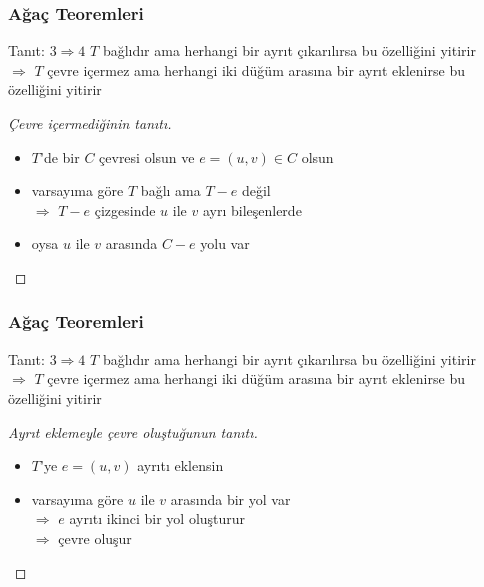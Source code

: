 \documentclass[dvipsnames]{beamer}
\theoremstyle{definition}
\theoremstyle{example}
\theoremstyle{plain}
\begin{document}
\begin{frame}
  \frametitle{Ağaç Teoremleri}

  \begin{block}{Tanıt: $3 \Rightarrow 4$}
    $T$ bağlıdır ama herhangi bir ayrıt çıkarılırsa bu özelliğini yitirir\\
    $\Rightarrow$ $T$ çevre içermez ama herhangi iki düğüm arasına bir ayrıt
      eklenirse bu özelliğini yitirir
  \end{block}

  \pause
  \begin{proof}[Çevre içermediğinin tanıtı]
    \begin{itemize}
      \item $T$'de bir $C$ çevresi olsun ve $e = (u,v) \in C$ olsun

      \pause
      \item varsayıma göre $T$ bağlı ama $T-e$ değil\\
        $\Rightarrow$ $T-e$ çizgesinde $u$ ile $v$ ayrı bileşenlerde

      \pause
      \item oysa $u$ ile $v$ arasında $C-e$ yolu var
    \end{itemize}
  \end{proof}
\end{frame}

\begin{frame}
  \frametitle{Ağaç Teoremleri}

  \begin{block}{Tanıt: $3 \Rightarrow 4$}
    $T$ bağlıdır ama herhangi bir ayrıt çıkarılırsa bu özelliğini yitirir\\
    $\Rightarrow$ $T$ çevre içermez ama herhangi iki düğüm arasına bir ayrıt
    eklenirse bu özelliğini yitirir
  \end{block}

  \begin{proof}[Ayrıt eklemeyle çevre oluştuğunun tanıtı]
    \begin{itemize}
      \pause
      \item $T$'ye $e = (u,v)$ ayrıtı eklensin

      \pause
      \item varsayıma göre $u$ ile $v$ arasında bir yol var\\
        $\Rightarrow$ $e$ ayrıtı ikinci bir yol oluşturur\\
        $\Rightarrow$ çevre oluşur
    \end{itemize}
  \end{proof}
\end{frame}
\end{document}
